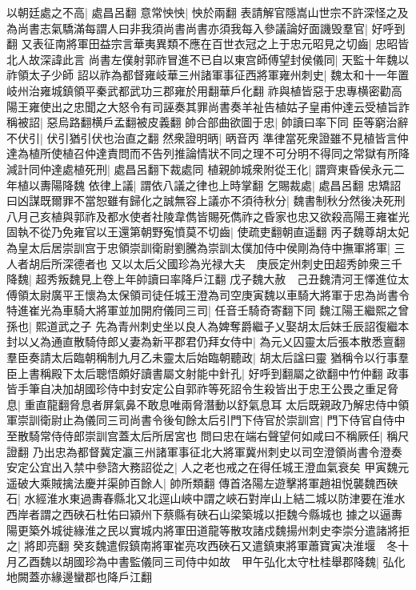 以朝廷處之不高|{
	處昌呂翻}
意常怏怏|{
	怏於兩翻}
表請解官隱嵩山世宗不許深怪之及為尚書志氣驕滿每謂人曰非我須尚書尚書亦須我每入參議論好面譏毁羣官|{
	好呼到翻}
又表征南將軍田益宗言華夷異類不應在百世衣冠之上于忠元昭見之切齒|{
	忠昭皆北人故深諱此言}
尚書左僕射郭祚冒進不已自以東宫師傅望封侯儀同|{
	天監十年魏以祚領太子少師}
詔以祚為都督雍岐華三州諸軍事征西將軍雍州刺史|{
	魏太和十一年置岐州治雍城鎮領平秦武都武功三郡雍於用翻華戶化翻}
祚與植皆惡于忠專横密勸高陽王雍使出之忠聞之大怒令有司誣奏其罪尚書奏羊祉告植姑子皇甫仲達云受植旨詐稱被詔|{
	惡烏路翻横戶孟翻被皮義翻}
帥合部曲欲圖于忠|{
	帥讀曰率下同}
臣等窮治辭不伏引|{
	伏引猶引伏也治直之翻}
然衆證明昞|{
	昞音丙}
準律當死衆證雖不見植皆言仲達為植所使植召仲達責問而不告列推論情狀不同之理不可分明不得同之常獄有所降減計同仲達處植死刑|{
	處昌呂翻下裁處同}
植親帥城衆附從王化|{
	謂齊東昏侯永元二年植以夀陽降魏}
依律上議|{
	謂依八議之律也上時掌翻}
乞賜裁處|{
	處昌呂翻}
忠矯詔曰凶謀既爾罪不當恕雖有歸化之誠無容上議亦不須待秋分|{
	魏書制秋分然後决死刑}
八月己亥植與郭祚及都水使者社陵韋儁皆賜死儁祚之昏家也忠又欲殺高陽王雍崔光固執不從乃免雍官以王還第朝野寃憤莫不切齒|{
	使疏吏翻朝直遥翻}
丙子魏尊胡太妃為皇太后居崇訓宫于忠領崇訓衛尉劉騰為崇訓太僕加侍中侯剛為侍中撫軍將軍|{
	三人者胡后所深德者也}
又以太后父國珍為光禄大夫　庚辰定州刺史田超秀帥衆三千降魏|{
	超秀叛魏見上卷上年帥讀曰率降戶江翻}
戊子魏大赦　己丑魏清河王懌進位太傅領太尉廣平王懷為太保領司徒任城王澄為司空庚寅魏以車騎大將軍于忠為尚書令特進崔光為車騎大將軍並加開府儀同三司|{
	任音壬騎奇寄翻下同}
魏江陽王繼熙之曾孫也|{
	熙道武之子}
先為青州刺史坐以良人為婢奪爵繼子乂娶胡太后妹壬辰詔復繼本封以乂為通直散騎侍郎乂妻為新平郡君仍拜女侍中|{
	為元乂囚靈太后張本散悉亶翻}
羣臣奏請太后臨朝稱制九月乙未靈太后始臨朝聽政|{
	胡太后諡曰靈}
猶稱令以行事羣臣上書稱殿下太后聰悟頗好讀書屬文射能中針孔|{
	好呼到翻屬之欲翻中竹仲翻}
政事皆手筆自决加胡國珍侍中封安定公自郭祚等死詔令生殺皆出于忠王公畏之重足脅息|{
	重直龍翻脅息者屏氣鼻不敢息唯兩脅潛動以舒氣息耳}
太后既親政乃解忠侍中領軍崇訓衛尉止為儀同三司尚書令後旬餘太后引門下侍官於崇訓宫|{
	門下侍官自侍中至散騎常侍侍郎崇訓宫蓋太后所居宮也}
問曰忠在端右聲望何如咸曰不稱厥任|{
	稱尺證翻}
乃出忠為都督冀定瀛三州諸軍事征北大將軍冀州刺史以司空澄領尚書令澄奏安定公宜出入禁中參諮大務詔從之|{
	人之老也戒之在得任城王澄血氣衰矣}
甲寅魏元遥破大乘賊擒法慶并渠帥百餘人|{
	帥所類翻}
傳首洛陽左遊擊將軍趙祖悦襲魏西硤石|{
	水經淮水東過夀春縣北又北逕山峽中謂之峽石對岸山上結二城以防津要在淮水西岸者謂之西硤石杜佑曰潁州下蔡縣有硤石山梁築城以拒魏今縣城也}
據之以逼夀陽更築外城徙緣淮之民以實城内將軍田道龍等散攻諸戍魏揚州刺史李崇分遣諸將拒之|{
	將即亮翻}
癸亥魏遣假鎮南將軍崔亮攻西硤石又遣鎮東將軍蕭寶寅决淮堰　冬十月乙酉魏以胡國珍為中書監儀同三司侍中如故　甲午弘化太守杜桂舉郡降魏|{
	弘化地闕蓋亦緣邊蠻郡也降戶江翻}
